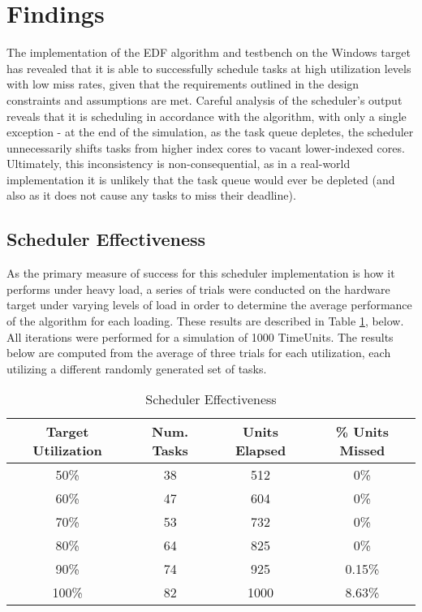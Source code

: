 
\section{Findings}\label{sec:findings}
The implementation of the EDF algorithm and testbench on the Windows target has revealed that it is able to successfully schedule tasks at high utilization levels with low miss rates, given that the requirements outlined in the design constraints and assumptions are met. Careful analysis of the scheduler's output reveals that it is scheduling in accordance with the algorithm, with only a single exception - at the end of the simulation, as the task queue depletes, the scheduler unnecessarily shifts tasks from higher index cores to vacant lower-indexed cores. Ultimately, this inconsistency is non-consequential, as in a real-world implementation it is unlikely that the task queue would ever be depleted (and also as it does not cause any tasks to miss their deadline).

\subsection{Scheduler Effectiveness}\label{subsec:schedulerData}
As the primary measure of success for this scheduler implementation is how it performs under heavy load, a series of trials were conducted on the hardware target under varying levels of load in order to determine the average performance of the algorithm for each loading. These results are described in Table \ref{table:SchedEffectiveness}, below. All iterations were performed for a simulation of 1000 TimeUnits. The results below are computed from the average of three trials for each utilization, each utilizing a different randomly generated set of tasks.

\begin{table}[h!]
    \centering\begin{tabular}{| c | c | c | c |}
        \hline
        Target Utilization & Num. Tasks & Units Elapsed & \% Units Missed \\
        \hline
        50\% & 38 & 512 & 0\% \\
        60\% & 47 & 604 & 0\% \\
        70\% & 53 & 732 & 0\% \\
        80\% & 64 & 825 & 0\% \\
        90\% & 74 & 925 & 0.15\% \\
        100\% & 82 & 1000 & 8.63\% \\
        \hline
    \end{tabular}
    \caption{Scheduler Effectiveness}
    \label{table:SchedEffectiveness}
\end{table}

